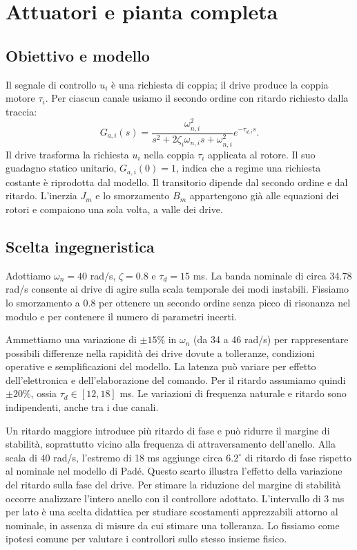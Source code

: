 \chapter{Attuatori e pianta completa}
\section{Obiettivo e modello}
Il segnale di controllo $u_i$ è una richiesta di coppia; il drive produce la coppia motore $\tau_i$. Per ciascun canale usiamo il secondo ordine con ritardo richiesto dalla traccia:
\[
 G_{a,i}(s)=\frac{\omega_{n,i}^2}{s^2+2\zeta_i\omega_{n,i}s+\omega_{n,i}^2}
 e^{-\tau_{d,i}s}.
\]
Il drive trasforma la richiesta $u_i$ nella coppia $\tau_i$ applicata
al rotore. Il suo guadagno statico unitario, $G_{a,i}(0)=1$, indica
che a regime una richiesta costante è riprodotta dal modello.
Il transitorio dipende dal secondo ordine e dal ritardo. L'inerzia
$J_m$ e lo smorzamento $B_m$ appartengono già alle equazioni dei
rotori e compaiono una sola volta, a valle dei drive.

\section{Scelta ingegneristica}
Adottiamo $\omega_n=40$ rad/s, $\zeta=0.8$ e $\tau_d=15$ ms.
La banda nominale di circa 34.78 rad/s consente ai drive di agire
sulla scala temporale dei modi instabili. Fissiamo lo smorzamento
a $0.8$ per ottenere un secondo ordine senza picco di risonanza
nel modulo e per contenere il numero di parametri incerti.

Ammettiamo una variazione di $\pm15\%$ in $\omega_n$ (da 34 a 46
rad/s) per rappresentare possibili differenze nella rapidità dei
drive dovute a tolleranze, condizioni operative e semplificazioni
del modello. La latenza può variare per effetto dell'elettronica e
dell'elaborazione del comando. Per il ritardo assumiamo quindi
$\pm20\%$, ossia $\tau_d\in[12,18]$ ms. Le variazioni di frequenza
naturale e ritardo sono indipendenti, anche tra i due canali.

Un ritardo maggiore introduce più ritardo di fase e può ridurre
il margine di stabilità, soprattutto vicino alla frequenza di
attraversamento dell'anello. Alla scala di 40 rad/s, l'estremo di
18 ms aggiunge circa $6.2^\circ$ di ritardo di fase rispetto al
nominale nel modello di Padé. Questo scarto illustra l'effetto della
variazione del ritardo sulla fase del drive. Per stimare la riduzione
del margine di stabilità occorre analizzare l'intero anello con il
controllore adottato. L'intervallo di 3 ms per lato è una scelta didattica
per studiare scostamenti apprezzabili attorno al nominale, in assenza
di misure da cui stimare una tolleranza. Lo fissiamo come ipotesi
comune per valutare i controllori sullo stesso insieme fisico.

